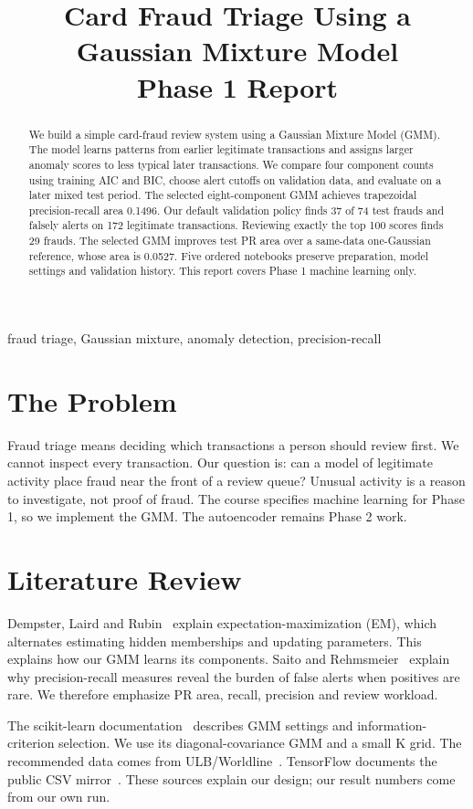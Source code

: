 \documentclass[conference]{IEEEtran}
\title{Card Fraud Triage Using a Gaussian Mixture Model\\Phase 1 Report}
\author{\IEEEauthorblockN{H Maheshwari, Vaibhav, Mayank, Keshav, Mitul Bhatia}
\IEEEauthorblockA{Team T011, Section A, Project 26\\Newton School of Technology, Rishihood University\\
2401010174, 2401010486, 2401010267, 2401010222, 2401010279}}
\begin{document}
\maketitle
\begin{abstract}
We build a simple card-fraud review system using a Gaussian Mixture Model (GMM). The model learns patterns from earlier legitimate transactions and assigns larger anomaly scores to less typical later transactions. We compare four component counts using training AIC and BIC, choose alert cutoffs on validation data, and evaluate on a later mixed test period. The selected eight-component GMM achieves trapezoidal precision-recall area 0.1496. Our default validation policy finds 37 of 74 test frauds and falsely alerts on 172 legitimate transactions. Reviewing exactly the top 100 scores finds 29 frauds. The selected GMM improves test PR area over a same-data one-Gaussian reference, whose area is 0.0527. Five ordered notebooks preserve preparation, model settings and validation history. This report covers Phase 1 machine learning only.
\end{abstract}
\begin{IEEEkeywords}fraud triage, Gaussian mixture, anomaly detection, precision-recall\end{IEEEkeywords}

\section{The Problem}
Fraud triage means deciding which transactions a person should review first. We cannot inspect every transaction. Our question is: can a model of legitimate activity place fraud near the front of a review queue? Unusual activity is a reason to investigate, not proof of fraud. The course specifies machine learning for Phase 1, so we implement the GMM. The autoencoder remains Phase 2 work.

\section{Literature Review}
Dempster, Laird and Rubin~\cite{em} explain expectation-maximization (EM), which alternates estimating hidden memberships and updating parameters. This explains how our GMM learns its components. Saito and Rehmsmeier~\cite{pr} explain why precision-recall measures reveal the burden of false alerts when positives are rare. We therefore emphasize PR area, recall, precision and review workload.

The scikit-learn documentation~\cite{sk} describes GMM settings and information-criterion selection. We use its diagonal-covariance GMM and a small K grid. The recommended data comes from ULB/Worldline~\cite{data}. TensorFlow documents the public CSV mirror~\cite{tf}. These sources explain our design; our result numbers come from our own run.
\end{document}
